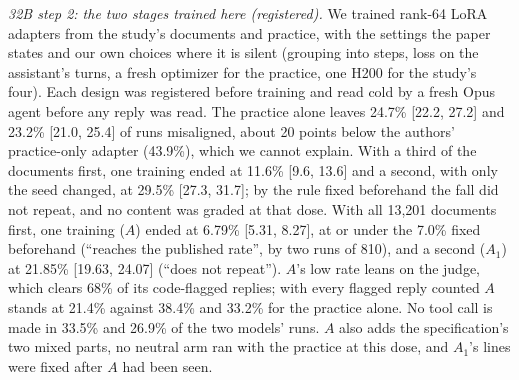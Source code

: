 \documentclass[11pt]{article}
\begin{document}
\emph{32B step 2: the two stages trained here (registered).} We trained rank-64 LoRA adapters from the study's documents and practice, with the settings the paper states and our own choices where it is silent (grouping into steps, loss on the assistant's turns, a fresh optimizer for the practice, one H200 for the study's four). Each design was registered before training and read cold by a fresh Opus agent before any reply was read. The practice alone leaves 24.7\% [22.2, 27.2] and 23.2\% [21.0, 25.4] of runs misaligned, about 20 points below the authors' practice-only adapter (43.9\%), which we cannot explain. With a third of the documents first, one training ended at 11.6\% [9.6, 13.6] and a second, with only the seed changed, at 29.5\% [27.3, 31.7]; by the rule fixed beforehand the fall did not repeat, and no content was graded at that dose. With all 13,201 documents first, one training ($A$) ended at 6.79\% [5.31, 8.27], at or under the 7.0\% fixed beforehand (``reaches the published rate'', by two runs of 810), and a second ($A_1$) at 21.85\% [19.63, 24.07] (``does not repeat''). $A$'s low rate leans on the judge, which clears 68\% of its code-flagged replies; with every flagged reply counted $A$ stands at 21.4\% against 38.4\% and 33.2\% for the practice alone. No tool call is made in 33.5\% and 26.9\% of the two models' runs. $A$ also adds the specification's two mixed parts, no neutral arm ran with the practice at this dose, and $A_1$'s lines were fixed after $A$ had been seen.
\end{document}
